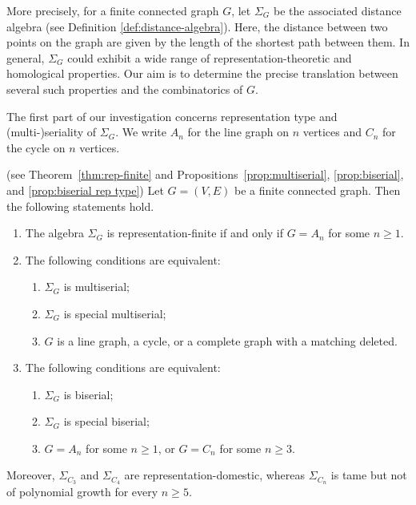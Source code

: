 \documentclass[a4paper,leqno]{amsart}
\begin{document}
More precisely, for a finite connected graph $G$, let $\Sigma_G$ be the associated distance algebra (see Definition \ref{def:distance-algebra}).  Here, the distance between two points on the graph are given by the length of the shortest path between them.
In general, $\Sigma_G$ could exhibit a wide range of  representation-theoretic and homological properties.
Our aim is to determine the precise translation between several such properties and the combinatorics of $G$.


The first part of our investigation concerns representation type and (multi-)seriality of $\Sigma_G$.  We write $A_n$ for the line graph on $n$ vertices and $C_n$ for the cycle on $n$ vertices. 

\begin{thm}\textnormal{(see Theorem~\ref{thm:rep-finite} and
Propositions~\ref{prop:multiserial}, \ref{prop:biserial}, and
\ref{prop:biserial rep type})}
Let $G=(V,E)$ be a finite connected graph.  Then the following statements
hold.
\begin{enumerate}
    \item The algebra $\Sigma_G$ is representation-finite if and only if $G=A_n$ for some $n\geq1$.

    \item The following conditions are equivalent:
    \begin{enumerate}
        \item $\Sigma_G$ is multiserial;
        \item $\Sigma_G$ is special multiserial;
        \item $G$ is a line graph, a cycle, or a complete graph with a
        matching deleted.
    \end{enumerate}

    \item The following conditions are equivalent:
    \begin{enumerate}
        \item $\Sigma_G$ is biserial;
        \item $\Sigma_G$ is special biserial;
        \item $G=A_n$ for some $n\geq1$, or $G=C_n$ for some $n\geq3$.
    \end{enumerate}
\end{enumerate}
Moreover, $\Sigma_{C_3}$ and $\Sigma_{C_4}$ are representation-domestic, whereas $\Sigma_{C_n}$ is tame but not of polynomial growth for every $n\geq5$.
\end{thm}
\end{document}
